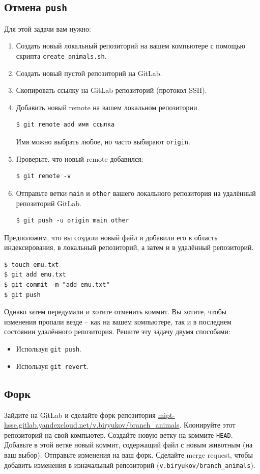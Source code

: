\documentclass{article}
\begin{document}
\subsection{Отмена \texttt{push}}
Для этой задачи вам нужно:
\begin{enumerate}
\item Создать новый локальный репозиторий на вашем компьютере с помощью скрипта \texttt{create\_animals.sh}.
\item Создать новый пустой репозиторий на GitLab.
\item Скопировать ссылку на GitLab репозиторий (протокол SSH).
\item Добавить новый remote на вашем локальном репозитории. 
\begin{lstlisting}[style=csMiptBash]
$ git remote add имя ссылка
\end{lstlisting}
Имя можно выбрать любое, но часто выбирают \texttt{origin}.
\item Проверьте, что новый remote добавился:
\begin{lstlisting}[style=csMiptBash]
$ git remote -v
\end{lstlisting}
\item Отправьте ветки \texttt{main} и \texttt{other} вашего локального репозитория на удалённый репозиторий GitLab.
\begin{lstlisting}[style=csMiptBash]
$ git push -u origin main other
\end{lstlisting}
\end{enumerate}

\noindent Предположим, что вы создали новый файл и добавили его в область индексирования, в локальный репозиторий, а затем и в удалённый репозиторий.
\begin{lstlisting}[style=csMiptBash]
$ touch emu.txt
$ git add emu.txt
$ git commit -m "add emu.txt"
$ git push
\end{lstlisting}
Однако затем передумали и хотите отменить коммит. Вы хотите, чтобы изменения пропали везде -- как на вашем компьютере, так и в последнем состоянии удалённого репозитория. Решите эту задачу двумя способами:
\begin{itemize}
\item Используя \texttt{git push}.
\item Используя \texttt{git revert}.
\end{itemize}

\subsection{Форк}
Зайдите на GitLab и сделайте форк репозитория \href{https://mipt-hsse.gitlab.yandexcloud.net/v.biryukov/branch_animals}{mipt-hsse.gitlab.yandexcloud.net/v.biryukov/branch\_animals}. Клонируйте этот репозиторий на свой компьютер. Создайте новую ветку на коммите \texttt{HEAD}. Добавьте в этой ветке новый коммит, содержащий файл с новым животным (на ваш выбор). Отправьте изменения на ваш форк. Сделайте merge request, чтобы добавить изменения в изначальный репозиторий (\texttt{v.biryukov/branch\_animals}).
\end{document}
